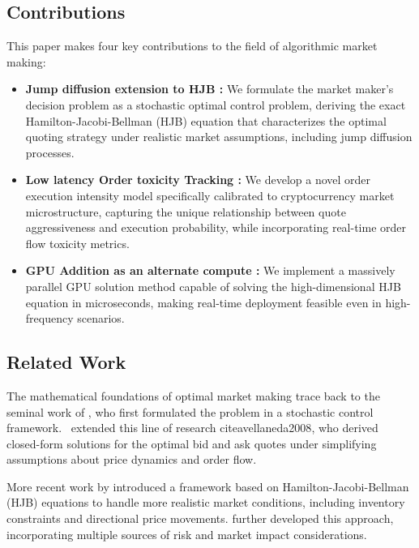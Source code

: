 \documentclass[onecolumn,ieee]{arithmaxresearch}
\begin{document}
\subsection{Contributions}

This paper makes four key contributions to the field of algorithmic market making:

\begin{itemize}
    \item \textbf {Jump diffusion extension to HJB : } We formulate the market maker's decision problem as a stochastic optimal control problem, deriving the exact Hamilton-Jacobi-Bellman (HJB) equation that characterizes the optimal quoting strategy under realistic market assumptions, including jump diffusion processes.
    
    \item \textbf{Low latency Order toxicity Tracking : } We develop a novel order execution intensity model specifically calibrated to cryptocurrency market microstructure, capturing the unique relationship between quote aggressiveness and execution probability, while incorporating real-time order flow toxicity metrics.
    
    \item \textbf{ GPU Addition as an alternate compute : }We implement a massively parallel GPU solution method capable of solving the high-dimensional HJB equation in microseconds, making real-time deployment feasible even in high-frequency scenarios.
    
\end{itemize}

\subsection {Related Work}

The mathematical foundations of optimal market making trace back to the seminal work of \cite{ho1981optimal}, who first formulated the problem in a stochastic control framework. \ extended this line of research cite{avellaneda2008}, who derived closed-form solutions for the optimal bid and ask quotes under simplifying assumptions about price dynamics and order flow.

More recent work by \cite{gueant2013} introduced a framework based on Hamilton-Jacobi-Bellman (HJB) equations to handle more realistic market conditions, including inventory constraints and directional price movements. \cite{cartea2015} further developed this approach, incorporating multiple sources of risk and market impact considerations.
\end{document}
